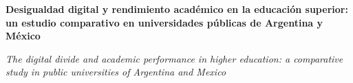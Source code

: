 
\renewcommand{\articuloidiomaxml}{es}
\renewcommand{\articulotitulo}{Desigualdad digital y rendimiento académico en la educación superior: un estudio comparativo en universidades públicas de Argentina y México}
\renewcommand{\articuloautores}{Georgina Berreta Invernizzi}
\renewcommand{\articulodoi}{10.18356/9789210029582c005}
\renewcommand{\articulotipo}{ARTÍCULO DE INVESTIGACIÓN}
\renewcommand{\articulorevista}{Blensera}
\renewcommand{\articuloissne}{2697-3650}
\renewcommand{\articulovolumen}{01}
\renewcommand{\articulonumero}{01}
\renewcommand{\articulofecha}{ 2026}
\renewcommand{\articulopagina}{1}

\setcounter{page}{1}
\thispagestyle{firstpage}

\noindent\begin{minipage}[t]{\dimexpr\textwidth+\marginparsep+\marginparwidth\relax}%
{\sffamily\bfseries\Large\articulotitulo\par}%
\end{minipage}\par
\vspace{3mm}%
\renewcommand{\articulotitulotrans}{The digital divide and academic performance in higher education: a comparative study in public universities of Argentina and Mexico}
\noindent\begin{minipage}[t]{\dimexpr\textwidth+\marginparsep+\marginparwidth\relax}%
{\sffamily\itshape\normalsize\articulotitulotrans\par}%
\end{minipage}\par
\vspace{4mm}%

